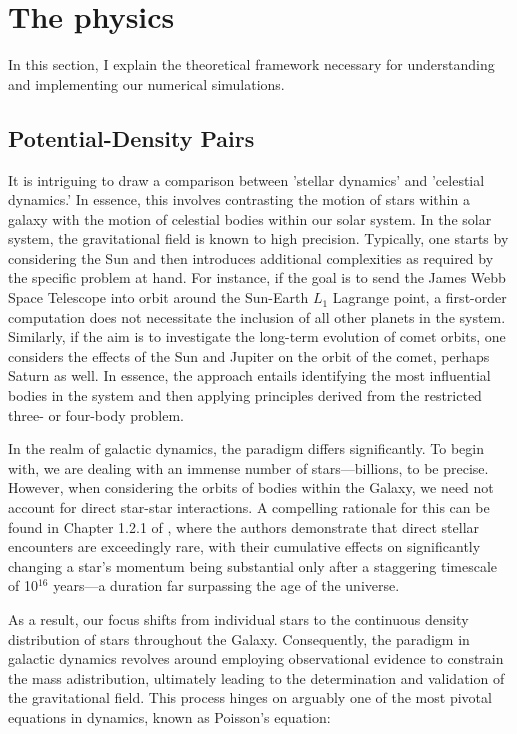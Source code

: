 
\section{The physics} \label{sec:ThePhysics}
In this section, I explain the theoretical framework necessary for understanding and implementing our numerical simulations.

\subsection{Potential-Density Pairs}\label{SEC:potential-density-pairs}

It is intriguing to draw a comparison between 'stellar dynamics' and 'celestial dynamics.' In essence, this involves contrasting the motion of stars within a galaxy with the motion of celestial bodies within our solar system. In the solar system, the gravitational field is known to high precision. Typically, one starts by considering the Sun and then introduces additional complexities as required by the specific problem at hand. For instance, if the goal is to send the James Webb Space Telescope into orbit around the Sun-Earth $L_1$ Lagrange point, a first-order computation does not necessitate the inclusion of all other planets in the system. Similarly, if the aim is to investigate the long-term evolution of comet orbits, one considers the effects of the Sun and Jupiter on the orbit of the comet, perhaps Saturn as well. In essence, the approach entails identifying the most influential bodies in the system and then applying principles derived from the restricted three- or four-body problem.

In the realm of galactic dynamics, the paradigm differs significantly. To begin with, we are dealing with an immense number of stars—billions, to be precise. However, when considering the orbits of bodies within the Galaxy, we need not account for direct star-star interactions. A compelling rationale for this can be found in Chapter 1.2.1 of \citet{2008gady.book.....B}, where the authors demonstrate that direct stellar encounters are exceedingly rare, with their cumulative effects on significantly changing a star's momentum being substantial only after a staggering timescale of 10$^{16}$ years—a duration far surpassing the age of the universe.

As a result, our focus shifts from individual stars to the continuous density distribution of stars throughout the Galaxy. Consequently, the paradigm in galactic dynamics revolves around employing observational evidence to constrain the mass adistribution, ultimately leading to the determination and validation of the gravitational field. This process hinges on arguably one of the most pivotal equations in dynamics, known as Poisson's equation:

